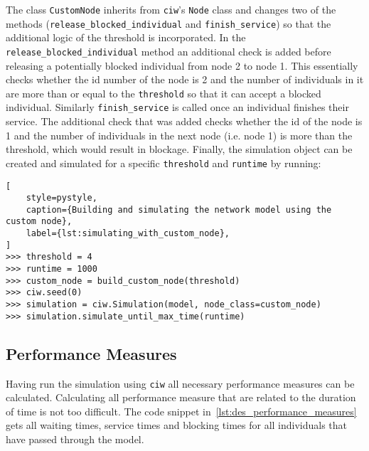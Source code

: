 The class \texttt{CustomNode} inherits from \texttt{ciw}'s
\texttt{Node} class and changes two of the methods
(\texttt{release\_blocked\_individual} and
\texttt{finish\_service}) so that the additional logic of the
threshold is incorporated.
In the \texttt{release\_blocked\_individual} method an
additional check is added before releasing a potentially blocked individual from
node 2 to node 1.
This essentially checks whether the id number of the node is 2 and
the number of individuals in it are more than or equal to the
\texttt{threshold} so that it can accept a blocked individual.
Similarly \texttt{finish\_service} is called once an individual
finishes their service.
The additional check that was added checks whether the id of the node is 1 and
the number of individuals in the next node (i.e. node 1) is more than the
threshold, which would result in blockage.
Finally, the simulation object can be created and simulated for a specific
\texttt{threshold} and \texttt{runtime} by running:

\begin{lstlisting}[
    style=pystyle,
    caption={Building and simulating the network model using the custom node},
    label={lst:simulating_with_custom_node},
]
>>> threshold = 4
>>> runtime = 1000
>>> custom_node = build_custom_node(threshold)
>>> ciw.seed(0)
>>> simulation = ciw.Simulation(model, node_class=custom_node)
>>> simulation.simulate_until_max_time(runtime)

\end{lstlisting}


\subsection{Performance Measures}

Having run the simulation using \texttt{ciw} all necessary
performance measures can be calculated.
Calculating all performance measure that are related to the duration of time is
not too difficult.
The code snippet in~\ref{lst:des_performance_measures} gets all waiting times,
service times and blocking times for all individuals that have passed through
the model.

